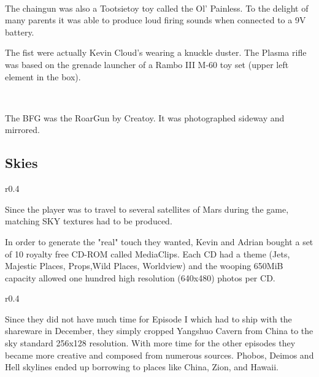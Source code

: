 \\
\par

The chaingun was also a Tootsietoy toy called the Ol' Painless. To the delight of many parents it was able to produce loud firing sounds when connected to a 9V battery.

\par
{}

\vspace{-5mm}
The fist were actually Kevin Cloud's wearing a knuckle duster. The Plasma rifle was based on the grenade launcher of a Rambo III M-60 toy set (upper left element in the box).
\par
{}\\
\par
The BFG was the RoarGun by Creatoy. It was photographed sideway and mirrored.\\
\par
{}
\pagebreak


\subsection{Skies}
\begin{wrapfigure}[7]{r}{0.4\textwidth}
\centering
{}
\end{wrapfigure}
Since the player was to travel to several satellites of Mars during the game, matching SKY textures had to be produced.\\
\par In order to generate the "real" touch they wanted, Kevin and Adrian bought a set of 10 royalty free CD-ROM called MediaClips. Each CD had a theme (Jets, Majestic Places, Props,Wild Places, Worldview) and the wooping 650MiB capacity allowed one hundred high resolution (640x480) photos per CD.\\
\par 

\begin{wrapfigure}[7]{r}{0.4\textwidth}
\centering
{}
\end{wrapfigure}

 Since they did not have much time for Episode I which had to ship with the shareware in December, they simply cropped Yangshuo Cavern from China to the sky standard 256x128 resolution.  With more time for the other episodes they became more creative and composed from numerous sources. Phobos, Deimos and Hell skylines ended up borrowing to places like China, Zion, and Hawaii. \\
\par

